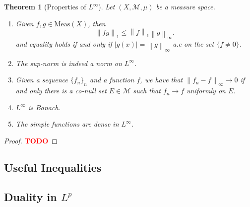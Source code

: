 \documentclass{article}
\newtheorem*{theorem}{Theorem}
\newcommand{\M}{\mathcal{M}}
\newcommand{\lnorm}[2]{\left\lVert#2 \right\rVert_{#1}}
\newcommand{\td}{\textcolor{red}{\textbf{TODO}}}
\begin{document}
\begin{theorem}[Properties of $L^{\infty}$]
    Let $(X, \M, \mu)$ be a measure space.
    \begin{enumerate}
        \item Given $f,g \in \text{Meas}(X)$, then 
        $$\lnorm{1}{fg} \leq \lnorm{1}{f} \lnorm{\infty}{g}.$$
        and equality holds if and only if $|g(x)| = \lnorm{\infty}{g}$ a.e on the set $\{f \neq 0\}$.
        \item The sup-norm is indeed a norm on $L^{\infty}$.
        \item Given a sequence $\{f_n\}_n$ and a function $f$, we have that $\lnorm{\infty}{f_n - f} \rightarrow 0$ if and only there is a co-null set $E \in \M$ such that $f_n \rightarrow f$ uniformly on $E$.
        \item $L^{\infty}$ is Banach.
        \item The simple functions are dense in $L^{\infty}$.
    \end{enumerate}
\end{theorem}

\begin{proof}
    \td 
\end{proof}

\subsection{Useful Inequalities}

\subsection{Duality in $L^p$}
\end{document}
